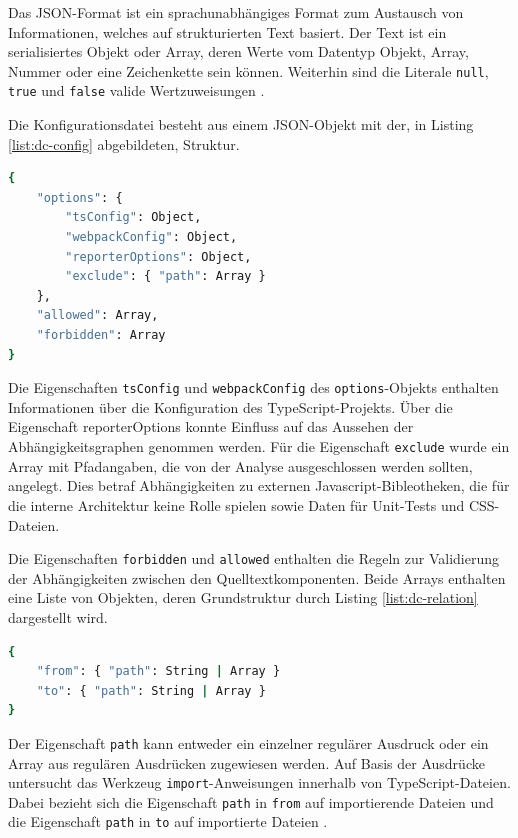 Das JSON-Format ist ein sprachunabhängiges Format zum Austausch von Informationen, welches auf strukturierten Text basiert. Der Text ist ein serialisiertes Objekt oder Array, deren Werte vom Datentyp Objekt, Array, Nummer oder eine Zeichenkette sein können. Weiterhin sind die Literale \lstinline|null|, \lstinline|true| und \lstinline|false| valide Wertzuweisungen \autocite[vgl.][]{JSON:Einführung}.  

Die Konfigurationsdatei besteht aus einem JSON-Objekt mit der, in Listing \ref{list:dc-config} abgebildeten, Struktur.
\begin{lstlisting}[language=sh, label=list:dc-config, caption=Struktur der Konfiguration für das dependency-cruiser-Werkzeug]
{
    "options": {
        "tsConfig": Object,
        "webpackConfig": Object,
        "reporterOptions": Object,
        "exclude": { "path": Array }
    },
    "allowed": Array,
    "forbidden": Array
}
\end{lstlisting}

Die Eigenschaften \lstinline|tsConfig| und \lstinline|webpackConfig| des \lstinline|options|-Objekts enthalten Informationen über die Konfiguration des TypeScript-Projekts. Über die Eigenschaft reporterOptions konnte Einfluss auf das Aussehen der Abhängigkeitsgraphen genommen werden. Für die Eigenschaft \lstinline|exclude| wurde ein Array mit Pfadangaben, die von der Analyse ausgeschlossen werden sollten, angelegt. Dies betraf Abhängigkeiten zu externen Javascript-Bibleotheken, die für die interne Architektur keine Rolle spielen sowie Daten für Unit-Tests und CSS-Dateien. 

Die Eigenschaften \lstinline|forbidden| und \lstinline|allowed| enthalten die Regeln zur Validierung der Abhängigkeiten zwischen den Quelltextkomponenten. 
Beide Arrays enthalten eine Liste von Objekten, deren Grundstruktur durch Listing \ref{list:dc-relation} dargestellt wird.

\begin{lstlisting}[language=sh, label=list:dc-relation, caption=Struktur der Objekte für die Arrays \lstinline|forbidden| und \lstinline|allowed|]
{
    "from": { "path": String | Array }
    "to": { "path": String | Array }
}
\end{lstlisting}
Der Eigenschaft \lstinline|path| kann entweder ein einzelner regulärer Ausdruck oder ein Array aus regulären Ausdrücken zugewiesen werden. 
Auf Basis der Ausdrücke untersucht das Werkzeug \lstinline|import|-Anweisungen innerhalb von TypeScript-Dateien. Dabei bezieht sich die Eigenschaft \lstinline|path| in \lstinline|from| auf importierende Dateien und die Eigenschaft \lstinline|path| in \lstinline|to| auf importierte Dateien \autocite[vgl.][]{Verweij:Rules}.

